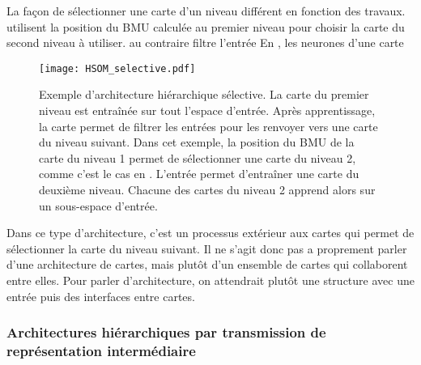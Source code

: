 \documentclass[../main]{subfiles}
\begin{document}
La façon de sélectionner une carte d'un niveau différent en fonction des travaux.
\cite{barbalho_hierarchical_2001} utilisent la position du BMU calculée au premier niveau pour choisir la carte du second niveau à utiliser.
\cite{zhao_stacked_2015} au contraire filtre l'entrée 
En \cite{??}, les neurones d'une carte 
\begin{figure}
    \texttt{[image: HSOM\_selective.pdf]}
    \caption{Exemple d'architecture hiérarchique sélective. La carte du premier niveau est entraînée sur tout l'espace d'entrée. Après apprentissage, la carte permet de filtrer les entrées pour les renvoyer vers une carte du niveau suivant. Dans cet exemple, la position du BMU de la carte du niveau 1 permet de sélectionner une carte du niveau 2, comme c'est le cas en \cite{barbalho_hierarchical_2001}. 
    L'entrée permet d'entraîner une carte du deuxième niveau. Chacune des cartes du niveau 2 apprend alors sur un sous-espace d'entrée.\label{fig:hsom_selective}}
\end{figure}

Dans ce type d'architecture, c'est un processus extérieur aux cartes qui permet de sélectionner la carte du niveau suivant. Il ne s'agit donc pas a proprement parler d'une architecture de cartes, mais plutôt d'un ensemble de cartes qui collaborent entre elles. Pour parler d'architecture, on attendrait plutôt une structure avec une entrée puis des interfaces entre cartes.

\subsubsection{Architectures hiérarchiques par transmission de représentation intermédiaire}
\end{document}
